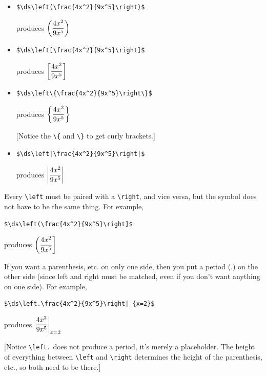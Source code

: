 \documentclass[12pt]{article}
\begin{document}
\begin{itemize}

\item \begin{verbatim}$\ds\left(\frac{4x^2}{9x^5}\right)$\end{verbatim}

produces $\displaystyle\left(\frac{4x^2}{9x^5}\right)$

\item \begin{verbatim}$\ds\left[\frac{4x^2}{9x^5}\right]$\end{verbatim}

produces $\displaystyle\left[\frac{4x^2}{9x^5}\right]$

\item \begin{verbatim}$\ds\left\{\frac{4x^2}{9x^5}\right\}$\end{verbatim}

produces $\displaystyle\left\{\frac{4x^2}{9x^5}\right\}$

[Notice the \verb|\{| and \verb|\}| to get curly brackets.]

\item \begin{verbatim}$\ds\left|\frac{4x^2}{9x^5}\right|$\end{verbatim}

produces $\displaystyle\left|\frac{4x^2}{9x^5}\right|$

\end{itemize}

Every \verb|\left| must be paired with a \verb|\right|, and vice versa, but the symbol does not have to be the same thing. For example,

\begin{verbatim}$\ds\left(\frac{4x^2}{9x^5}\right]$\end{verbatim}

produces $\displaystyle\left(\frac{4x^2}{9x^5}\right]$

If you want a parenthesis, etc. on only one side, then you put a period (.) on the other side (since left and right must be matched, even if you don't want anything on one side). For example,

\begin{verbatim}$\ds\left.\frac{4x^2}{9x^5}\right|_{x=2}$\end{verbatim}

produces $\displaystyle\left.\frac{4x^2}{9x^5}\right|_{x=2}$

[Notice \verb|\left.| does not produce a period, it's merely a placeholder. The height of everything between \verb|\left| and \verb|\right| determines the height of the parenthesis, etc., so both need to be there.]
\end{document}
